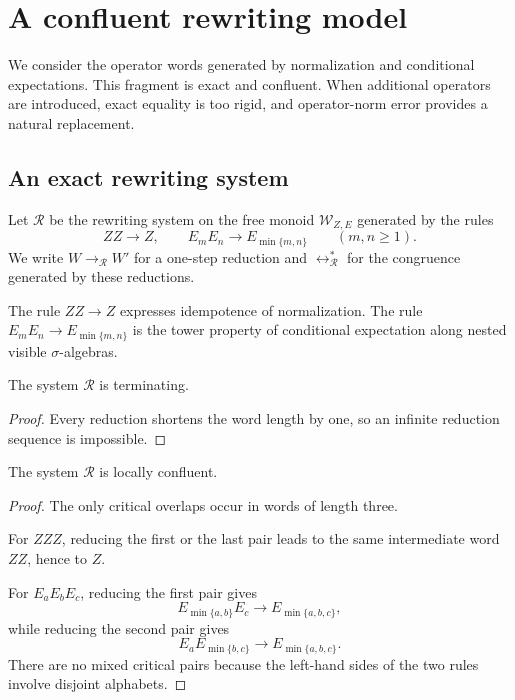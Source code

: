 \section{A confluent rewriting model}\label{sec:rewriting}

We consider the operator words generated by normalization and conditional
expectations.  This fragment is exact and confluent.  When additional
operators are introduced, exact equality is too rigid, and operator-norm error
provides a natural replacement.

\subsection{An exact rewriting system}

\begin{definition}
\label{def:rewrite-system}
Let \(\mathcal R\) be the rewriting system on the free monoid
\(\mathcal W_{Z,E}\) generated by the rules
\[
  ZZ\longrightarrow Z,
  \qquad
  E_mE_n\longrightarrow E_{\min\{m,n\}}
  \qquad (m,n\ge 1).
\]
We write \(W\to_{\mathcal R}W'\) for a one-step reduction and
\(\leftrightarrow_{\mathcal R}^*\) for the congruence generated by these
reductions.
\end{definition}

\begin{remark}\label{rem:rewrite-semantics}
The rule \(ZZ\to Z\) expresses idempotence of normalization.  The rule
\(E_mE_n\to E_{\min\{m,n\}}\) is the tower property of conditional expectation
along nested visible \(\sigma\)-algebras.
\end{remark}

\begin{lemma}[Termination]
\label{lem:rewrite-termination}
The system \(\mathcal R\) is terminating.
\end{lemma}

\begin{proof}
Every reduction shortens the word length by one, so an infinite reduction
sequence is impossible.
\end{proof}

\begin{lemma}
\label{lem:rewrite-local-confluence}
The system \(\mathcal R\) is locally confluent.
\end{lemma}

\begin{proof}
The only critical overlaps occur in words of length three.

For \(ZZZ\), reducing the first or the last pair leads to the same intermediate
word \(ZZ\), hence to \(Z\).

For \(E_aE_bE_c\), reducing the first pair gives
\[
  E_{\min\{a,b\}}E_c\to E_{\min\{a,b,c\}},
\]
while reducing the second pair gives
\[
  E_aE_{\min\{b,c\}}\to E_{\min\{a,b,c\}}.
\]
There are no mixed critical pairs because the left-hand sides of the two rules
involve disjoint alphabets.
\end{proof}

